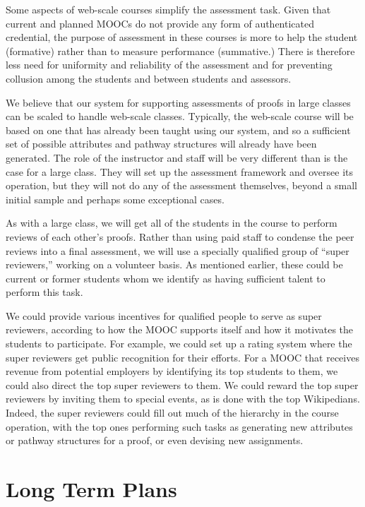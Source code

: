 \documentclass[12pt]{article}
\begin{document}
Some aspects of web-scale courses simplify the assessment task.
Given that current and planned MOOCs do not provide
any form of authenticated credential, the purpose of assessment in
these courses is more to help the student (formative) rather than to
measure performance (summative.)  There is therefore less need for
uniformity and reliability of the assessment and for preventing
collusion among the students and between students and assessors.

We believe that our system for supporting assessments of proofs in
large classes can be scaled to handle web-scale classes.  Typically,
the web-scale course will be based on one that has already been
taught using our system, and so a sufficient set of possible attributes and
pathway structures will already have been generated.  The role of the
instructor and staff will be very different than is the case for a
large class.  They will set up the assessment framework and oversee
its operation, but they will not do any of the assessment themselves,
beyond a small initial sample and perhaps some exceptional cases.

As with a large class, we will get all of the students in the course
to perform reviews of each other's proofs.  Rather than using paid
staff to condense the peer reviews into a final assessment, we will
use a specially qualified group of ``super reviewers,'' working on a
volunteer basis.  As mentioned earlier, these could be current or
former students whom we identify as having sufficient talent to
perform this task.

We could provide various incentives for qualified people to serve as
super reviewers, according to how the MOOC supports itself and how it
motivates the students to participate.  For example, we could set up a
rating system where the super reviewers get public recognition for
their efforts.  For a MOOC that receives revenue from potential
employers by identifying its top students to them, we could also
direct the top super reviewers to them.  We could reward the top super
reviewers by inviting them to special events, as is done with the top
Wikipedians.  Indeed, the super reviewers could fill out much of the
hierarchy in the course operation, with the top ones performing such
tasks as generating new attributes or pathway structures for a proof,
or even devising new assignments.

\section{Long Term Plans}
\end{document}
